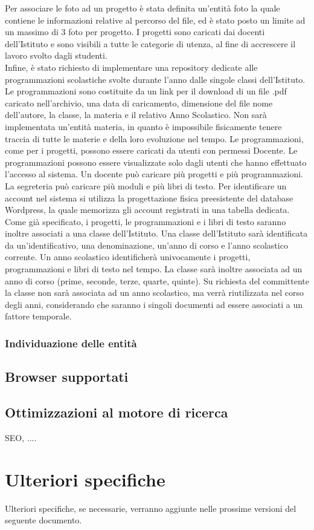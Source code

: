\documentclass{article}
\begin{document}
	Per associare le foto ad un progetto è stata definita un'entità foto la quale contiene le informazioni relative al percorso del file, ed è stato posto un limite ad un massimo di 3 foto per progetto.
	I progetti sono caricati dai docenti dell'Istituto e sono visibili a tutte le categorie di utenza, al fine di accrescere il lavoro svolto dagli studenti.\\
	Infine, è stato richiesto di implementare una repository dedicate alle programmazioni scolastiche svolte durante l'anno dalle singole classi dell'Istituto.
	Le programmazioni sono costituite da un link per il download di un file .pdf caricato nell'archivio, una data di caricamento, dimensione del file nome dell'autore, la classe, la materia e il relativo Anno Scolastico. Non sarà implementata un'entità materia, in quanto è impossibile fisicamente tenere traccia di tutte le materie e della loro evoluzione nel tempo.
	Le programmazioni, come per i progetti, possono essere caricati da utenti con permessi Docente.
	Le programmazioni possono essere visualizzate solo dagli utenti che hanno effettuato l'accesso al sistema.
	Un docente può caricare più progetti e più programmazioni. La segreteria può caricare più moduli e più libri di testo.
	Per identificare un account nel sistema si utilizza la progettazione fisica preesistente del database Wordpress, la quale memorizza gli account registrati in una tabella dedicata. 
	Come già specificato, i progetti, le programmazioni e i libri di testo saranno inoltre associati a una classe dell'Istituto. Una classe dell'Istituto sarà identificata da un'identificativo, una denominazione, un'anno di corso e l'anno scolastico corrente. Un anno scolastico identificherà univocamente i progetti, programmazioni e libri di testo nel tempo. La classe sarà inoltre associata ad un anno di corso (prime, seconde, terze, quarte, quinte). Su richiesta del committente la classe non sarà associata ad un anno scolastico, ma verrà riutilizzata nel corso degli anni, considerando che saranno i singoli documenti ad essere associati a un fattore temporale. 
	
	\subsubsection{\textbf{Individuazione delle entità}}

	\subsection{\textbf{Browser supportati}}

	\subsection{\textbf{Ottimizzazioni al motore di ricerca}}
	SEO, ....	
\clearpage
	
\section{\textbf{Ulteriori specifiche}}
Ulteriori specifiche, se necessarie, verranno aggiunte nelle prossime versioni del seguente documento.
\end{document}
